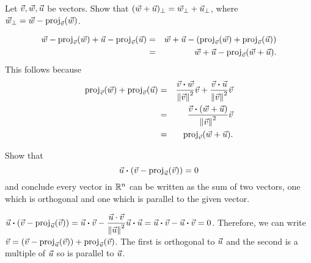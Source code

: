 \documentclass{ximera}
\begin{document}
  \begin{example}\label{perp-linear}
    Let $\vec{v},\vec{w},\vec{u}$ be vectors. Show that
    $(\vec{w}+\vec{u})_{\perp}=\vec{w}_{\perp}+\vec{u}_{\perp}$,
    where $\vec{w}_{\perp}=\vec{w}-\text{proj}_{\vec{v}}(\vec{w})$.
    \begin{solution}
      \begin{eqnarray*}
        \vec{w}-\text{proj}_{\vec{v}}(\vec{w})+\vec{u}-\text{proj}_{\vec{v}}(\vec{u})
        &=& \vec{w}+\vec{u}-(\text{proj}_{\vec{v}}(\vec{w})+\text{proj}_{\vec{v}}(\vec{u})) \\
        &=&\vec{w}+\vec{u}-\text{proj}_{\vec{v}}(\vec{w}+\vec{u}).
      \end{eqnarray*}
      This follows because
      \begin{eqnarray*}
        \text{proj}_{\vec{v}}(\vec{w})+\text{proj}_{\vec{v}}(\vec{u})
        &=& \frac{\vec{v}\boldsymbol{\cdot}\vec{w}}{\left\|\vec{v}\right\|^2}\vec{v}
            + \frac{\vec{v}\boldsymbol{\cdot}\vec{u}}{\left\|\vec{v}\right\|^2}\vec{v} \\
        &=& \frac{\vec{v}\boldsymbol{\cdot}(\vec{w}+\vec{u})}{\left\|\vec{v}\right\|^2}\vec{v} \\
        &=& \text{proj}_{\vec{v}}(\vec{w}+\vec{u}).
      \end{eqnarray*}
    \end{solution}
  \end{example}
  
  \begin{example}
    Show that
    \begin{equation*}
      \vec{u}\boldsymbol{\cdot}(\vec{v}-\text{proj}_{\vec{u}}(\vec{v}))=0
    \end{equation*}
    and conclude every vector in $\mathbb{R}^n$ can be written as the sum of
    two vectors, one which is orthogonal and one which is parallel to
    the given vector.
    \begin{solution}
      $\displaystyle\vec{u}\boldsymbol{\cdot}(\vec{v}-\text{proj}_{\vec{u}}(\vec{v}))
      = \vec{u} \boldsymbol{\cdot} \vec{v}-\frac{\vec{u}\cdot\vec{v}}{\left\|\vec{u}\right\|^2}\vec{u}\boldsymbol{\cdot}\vec{u}
      = \vec{u} \boldsymbol{\cdot} \vec{v}
      - \vec{u} \boldsymbol{\cdot} \vec{v}
      =0$. Therefore, we can write
      $\vec{v} = (\vec{v} - \text{proj}_{\vec{u}}(\vec{v})) +
      \text{proj}_{\vec{u}}(\vec{v})$. The first is orthogonal to
      $\vec{u}$ and the second is a multiple of $\vec{u}$ so is
      parallel to $\vec{u}$.
    \end{solution}
  \end{example}
\end{document}
